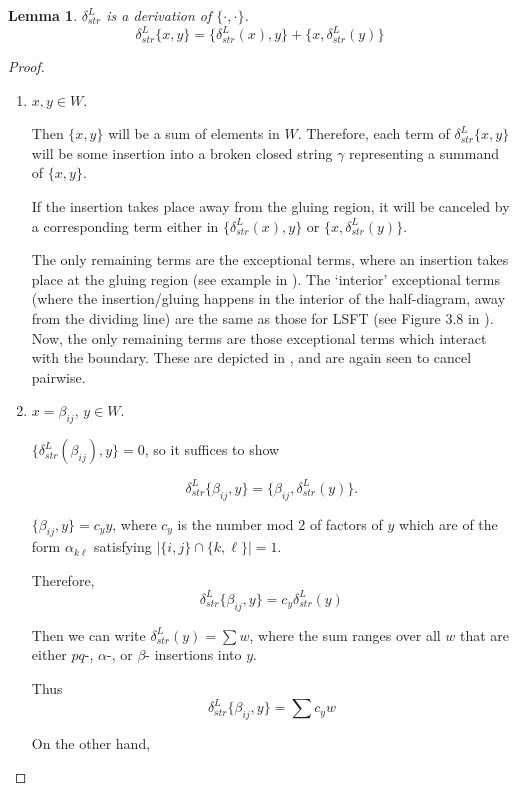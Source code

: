 \documentclass[a4paper,final, reqno]{amsart}
\theoremstyle{plain}
\newtheorem{Lemma}[Th]{Lemma}
\theoremstyle{definition}
\begin{document}
	\begin{Lemma}
		$\delta_{str}^L$ is a derivation of $\{\cdot, \cdot\}$.
		\[ \delta_{str}^L \{x,y\} = \{\delta_{str}^L(x), y\} + \{x, \delta_{str}^L(y)\}\]
	\end{Lemma}
	\begin{proof}\-\
		
		\begin{enumerate}
			\item $x, y \in W$.
			
			Then $\{x,y\}$ will be a sum of elements in $W$. Therefore, each term of $\delta_{str}^L\{x,y\}$ will be some insertion into a broken closed string $\gamma$ representing a summand of $\{x,y\}$. 
			
			If the insertion takes place away from the gluing region, it will be canceled by a corresponding term either in $\{\delta_{str}^L(x), y\}$ or $\{x, \delta_{str}^L(y)\}$.
			
			The only remaining terms are the exceptional terms, where an insertion takes place at the gluing region (see example in ). The `interior' exceptional terms (where the insertion/gluing happens in the interior of the half-diagram, away from the dividing line) are the same as those for LSFT (see Figure 3.8 in \cite{ng}). Now, the only remaining terms are those exceptional terms which interact with the boundary. These are depicted in , and are again seen to cancel pairwise.
			
			
			\item $x = \beta_{ij}$, $y \in W$.
			
			$\{\delta_{str}^L(\beta_{ij}), y\} = 0$, so it suffices to show
			
			\[ \delta_{str}^L \{\beta_{ij},y\} = \{\beta_{ij}, \delta_{str}^L(y)\}.\]
			
			$\{\beta_{ij}, y\} = c_y y$, where $c_y$ is the number mod 2 of factors of $y$ which are of the  form $\alpha_{k\ell}$ satisfying $|\{i,j\} \cap \{k,\ell\}| = 1$. 
			
			Therefore, 
			\[ \delta_{str}^L \{\beta_{ij}, y\} = c_y\delta_{str}^L(y)\]
			
			
			
			Then we can write $\delta_{str}^L(y) = \sum w$, where the sum ranges over all $w$ that are either $pq$-, $\alpha$-, or $\beta$- insertions into $y$. 
			
			Thus
			\[ \delta_{str}^L \{\beta_{ij}, y\} = \sum c_y w\]  
			
			On the other hand,
			

\end{enumerate}
\end{proof}
\end{document}
